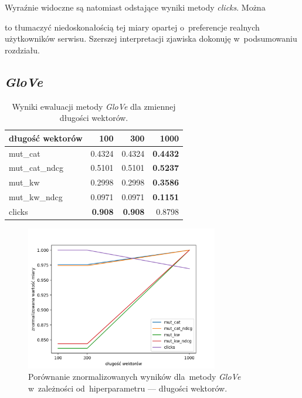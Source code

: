 \documentclass[pl]{minipw} %
\begin{document}
Wyraźnie widoczne są natomiast odstające wyniki metody \textit{clicks}. Można \begin{center}
	
\end{center}to tłumaczyć niedoskonałością tej miary opartej o~preferencje realnych użytkowników serwisu. Szerszej interpretacji zjawiska dokonuję w~podsumowaniu rozdziału.

\subsection{\textit{GloVe}}

\begin{table}[H]
	\centering
	\begin{tabular}{lrrr}
		\hline
		długość wektorów &      100 &      300 &     1000 \\
		\hline
		mut\_cat      & 0.4324 & 0.4324 & \textbf{0.4432} \\
		mut\_cat\_ndcg & 0.5101 & 0.5101 & \textbf{0.5237} \\
		mut\_kw       & 0.2998 & 0.2998 &\textbf{ 0.3586} \\
		mut\_kw\_ndcg  & 0.0971 & 0.0971 & \textbf{0.1151} \\
		clicks       & \textbf{0.908}  & \textbf{0.908}  & 0.8798 \\
		\hline
	\end{tabular}
	\caption{Wyniki ewaluacji metody \textit{GloVe} dla zmiennej długości wektorów.}
\end{table}

\begin{figure}[H]
	\centering
	\includegraphics[width=0.75\textwidth]{img/results/gv_ctr.png}
	\caption{Porównanie znormalizowanych wyników dla~metody \textit{GloVe} w~zależności od~hiperparametru --- długości wektorów.}
\end{figure}
\end{document}
